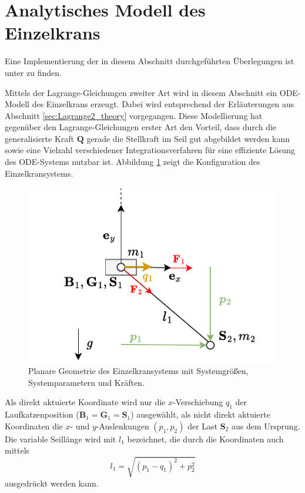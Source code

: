 \section{Analytisches Modell des Einzelkrans}
\label{sec:single_crane}
Eine Implementierung der in diesem Abschnitt durchgeführten Überlegungen ist unter \cite[flatness\_notebooks/ODE\_flatness\_analysis\_single\_crane.ipynb]{SAGithub} zu finden.

Mittels der Lagrange-Gleichungen zweiter Art wird in diesem Abschnitt ein ODE-Modell des Einzelkrans erzeugt. Dabei wird entsprechend der Erläuterungen aus Abschnitt \ref{sec:Lagrange2_theory} vorgegangen. Diese Modellierung hat gegenüber den Lagrange-Gleichungen erster Art  den Vorteil, dass durch die generalisierte Kraft $\mathbf{Q}$ gerade die Stellkraft im Seil gut abgebildet werden kann sowie eine Vielzahl verschiedener Integrationsverfahren für eine effiziente Lösung des ODE-Systems nutzbar ist. Abbildung \ref{fig:single_crane_diagram} zeigt die Konfiguration des Einzelkransystems.

\begin{figure}[ht]
	\begin{center}
		\includegraphics[scale=1]{Pictures/ODE_flatness_analysis_single_crane_diagram}
	\end{center}
	\caption[Planare Geometrie des Einzelkransystems]
	{Planare Geometrie des Einzelkransystems mit Systemgrößen, Systemparametern und Kräften.}
	\label{fig:single_crane_diagram}
\end{figure}

Als direkt aktuierte Koordinate wird nur die $x$-Verschiebung $q_1$ der Laufkatzenposition ($\mathbf{B}_1 = \mathbf{G}_1 = \mathbf{S}_1$) ausgewählt, als nicht direkt aktuierte Koordinaten die $x$- und $y$-Auslenkungen $(p_1, p_2)$ der Last $\mathbf{S}_2$ aus dem Ursprung. Die variable Seillänge wird mit $l_1$ bezeichnet, die durch die Koordinaten auch mittels
\begin{equation}
	l_1 = \sqrt{(p_1 - q_1)^2 + p_2^2}
\end{equation}
ausgedrückt werden kann.


